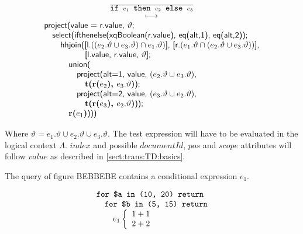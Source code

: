 \begin{equation}
\begin{array}{c}
\frac{}{\mbox{\texttt{if }}e_1\mbox{\texttt{ then }}e_2\mbox{\texttt{ else }}e_3} \\
\longmapsto \\
\begin{array}{l}
\mbox{\textsf{project(value = r.value, }}\vartheta\mbox{\textsf{;}} \\ \quad
\mbox{\textsf{select(ifthenelse(xqBoolean(r.value), eq(alt,1), eq(alt,2));}} \\ \quad \quad
\mbox{\textsf{hhjoin([l.}}((e_2.\vartheta \cup e_3.\vartheta)\cap e_1.\vartheta)\mbox{\textsf{],
[r.}}(e_1.\vartheta\cap (e_2.\vartheta\cup e_3.\vartheta))
\mbox{\textsf{],}} 
\\  \quad \quad \quad \quad \quad\mbox{\textsf{[l.value, r.value, }}\vartheta\mbox{\textsf{];}}\\\quad\quad\quad
\mbox{\textsf{union(}} \\ \quad\quad\quad\quad
\mbox{\textsf{project(alt=1, value, }}(e_2.\vartheta \cup e_3.\vartheta)\mbox{\textsf{,}}\\\quad\quad\quad\quad\quad
\mbox{\textbf{t(r(}}e_2\mbox{\textbf{), }}e_3.\vartheta\mbox{\textbf{)}\textsf{);}} \\ \quad\quad\quad\quad
\mbox{\textsf{project(alt=2, value, }}(e_3.\vartheta\cup e_2.\vartheta)\mbox{\textsf{,}}\\\quad\quad\quad\quad\quad
\mbox{\textbf{t(r(}}e_3\mbox{\textbf{), }}e_2.\vartheta\mbox{\textbf{)}\textsf{));}}\\\quad\quad\quad
\mbox{\textbf{r(}}e_1\mbox{\textbf{)}\textsf{)))}}
\end{array}
\end{array}
\end{equation}

Where $\vartheta = e_1.\vartheta \cup e_2.\vartheta \cup e_3.\vartheta$. The test expression will have to be
evaluated in the logical context $\Lambda$. $index$ and possible $documentId$, $pos$ and $scope$ attributes will
follow $value$ as described in \ref{sect:trans:TD:basics}.

\begin{myExample}
The query of figure BEBBEBE contains a conditional expression $e_1$.
\begin{figure}[h]
\centering
\begin{equation*}
\begin{array}{l}
\mbox{\texttt{for \$a in (10, 20) return}} \\ \quad
\mbox{\texttt{for \$b in (5, 15) return}} \\ \quad \quad
e_1 \left\{\begin{array}{l}
           1 + 1 \\
           2 + 2
           \end{array}\right.
\end{array}
\end{equation*}
\end{figure}


\end{myExample}



